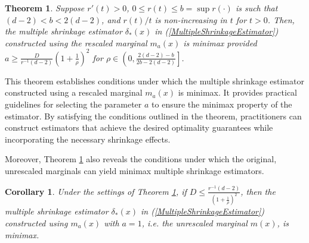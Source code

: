 \documentclass[11pt]{article}
\newtheorem{theorem}{Theorem}
\newtheorem{corollary}{Corollary}
\theoremstyle{definition}
\begin{document}
\begin{theorem}
 Suppose $r'(t) > 0$, $0 \leq r(t) \leq b = \sup r(\cdot)$ is such that $(d-2) < b < 2(d-2)$, and $r(t)/t$ is non-increasing in $t$ for $t > 0$.  Then, the multiple shrinkage estimator $\delta_{*}(x)$ in (\ref{MultipleShrinkageEstimator}) constructed using the rescaled marginal $m_a(x)$ is minimax provided $a \geq \frac{D}{r^{-1}(d-2)}\left(1 + \frac{1}{\rho}\right)^2$  for  $\rho \in \left(0, \frac{2(d - 2) - b}{2b - 2(d - 2)}\right]$.
    \label{MainResult2}
\end{theorem}
This theorem establishes conditions under which the multiple shrinkage estimator constructed using a rescaled marginal $m_a(x)$ is minimax. It provides practical guidelines for selecting the parameter $a$ to ensure the minimax property of the estimator. By satisfying the conditions outlined in the theorem, practitioners can construct estimators that achieve the desired optimality guarantees while incorporating the necessary shrinkage effects.  

Moreover, Theorem \ref{MainResult2} also reveals the conditions under which the original, unrescaled marginals can yield minimax multiple shrinkage estimators.
\begin{corollary}
    Under the settings of Theorem \ref{MainResult2}, if $D \leq \frac{r^{-1}(d-2)}{\left(1 + \frac{1}{\rho}\right)^2}$, then the multiple shrinkage estimator $\delta_{*}(x)$ in (\ref{MultipleShrinkageEstimator}) constructed using $m_a(x)$ with $a =1$, i.e. the unrescaled marginal $m(x)$, is minimax.
\end{corollary}
\end{document}
